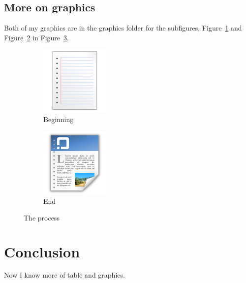 \documentclass{proc}
\begin{document}
\subsection{More on graphics}
Both of my graphics are in the graphics folder for the subfigures,
Figure~\ref{fig:paper} and Figure~\ref{fig:page} in Figure~\ref{fig:subs}.

\begin{figure}[htbp]
\centering %

\begin{subfigure}[b]{0.2\textwidth}
	\centering
	\includegraphics[scale=0.5]{Paper.png}
	\caption{Beginning}
	\label{fig:paper}	
\end{subfigure}%
\begin{subfigure}[b]{0.2\textwidth}
	\centering
	\includegraphics[scale=0.5]{Page.png}
	\caption{End}
	\label{fig:page}	
\end{subfigure}%

\caption{The process}
\label{fig:subs}

\end{figure}


\section{Conclusion}
Now I know more of table and graphics.
\end{document}
